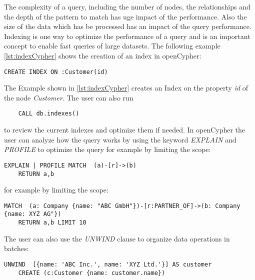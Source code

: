 The complexity of a query, including the number of nodes, the relationships and the depth of the
pattern to match has uge impact of the performance. Also the size of the data which has 
be processed has an impact of the query performance. Indexing is one way to optimize the 
performance of a query and is an important concept to enable fast queries of large 
datasets. The following example \cref{lst:indexCypher} shows the creation of an index in openCypher:
\begin{lstlisting}[caption={Index creation in openCypher}, label={lst:indexCypher}] 
	CREATE INDEX ON :Customer(id)
\end{lstlisting}
The Example shown in \cref{lst:indexCypher} creates an Index on the property \textit{id}
of the node \textit{Customer}. The user can also run 
\begin{lstlisting} 
	CALL db.indexes()
\end{lstlisting}
to review the current indexes and optimize them  if needed.
\newline
In openCypher the user can analyze how the query works by using the keyword \textit{EXPLAIN}
and \textit{PROFILE} to optimize the query for example by limiting the scope:
\begin{lstlisting}[caption={Using EXPLAIN or PROFILE in openCypher}, label={lst:explainProfileInopenCypher}] 
	EXPLAIN | PROFILE MATCH  (a)-[r]->(b)
	RETURN a,b
\end{lstlisting}
for example by limiting the scope:
\begin{lstlisting}[caption={Set a Limit in openCypher}, label={lst:limitInopenCypher}] 
	MATCH  (a: Company {name: "ABC GmbH"})-[r:PARTNER_OF]->(b: Company {name: XYZ AG"})
	RETURN a,b LIMIT 10
\end{lstlisting}
The user can also use the \textit{UNWIND} clause to organize data operations in batches:
\begin{lstlisting}[caption={Batch operations in openCypher using UNWIND}, label={lst:batchInopenCypher}] 
	UNWIND  [{name: 'ABC Inc.', name: 'XYZ Ltd.'}] AS customer
	CREATE (c:Customer {name: customer.name})
\end{lstlisting}


